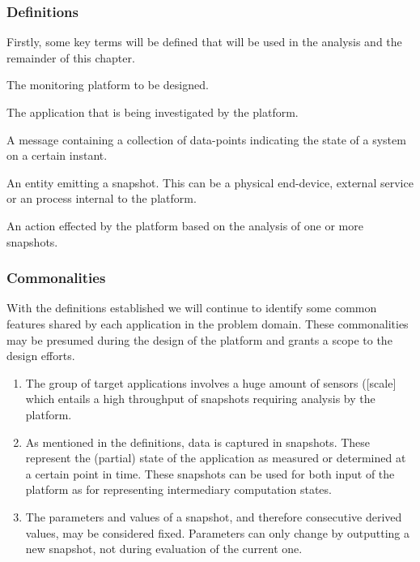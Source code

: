 \subsubsection*{Definitions}
Firstly, some key terms will be defined that will be used in the analysis and the remainder of this chapter.
\begin{description}[style=nextline]
\nospace
\item[Platform] The monitoring platform to be designed.
\item[Application] The application that is being investigated by the platform.
\item[Snapshot] A message containing a collection of data-points indicating the state of a system on a certain instant.
\item[Source] An entity emitting a snapshot. This can be a physical end-device, external service or an process internal to the platform.
\item[Consequence] An action effected by the platform based on the analysis of one or more snapshots.
\end{description}
\subsubsection*{Commonalities}
With the definitions established we will continue to identify some common features shared by each application in the problem domain. These commonalities may be presumed during the design of the platform and grants a scope to the design efforts.
\begin{enumerate}[label=C\archid .\arabic*]
\nospace
\item \label{c:scale_sensor} The group of target applications involves a huge amount of sensors ([scale] which entails a high throughput of snapshots requiring analysis by the platform.
\item \label{c:snapshot} As mentioned in the definitions, data is captured in snapshots. These represent the (partial) state of the application as measured or determined at a certain point in time. These snapshots can be used for both input of the platform as for representing intermediary computation states.
\item \label{c:snapshot_transformation} The parameters and values of a snapshot, and therefore consecutive derived values, may be considered fixed. Parameters can only change by outputting a new snapshot, not during evaluation of the current one.
\end{enumerate}

